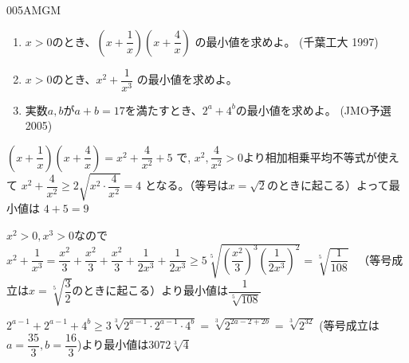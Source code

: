 \begin{thm}{005}{}{AMGM}
 \begin{enumerate}
  \item $x>0$のとき、$\left(x+\dfrac{1}{x}\right)\left(x+\dfrac{4}{x}\right)$ の最小値を求めよ。 (千葉工大 1997)
  \item $x>0$のとき、$x^2+\dfrac{1}{x^3}$ の最小値を求めよ。
  \item 実数$a,b$が$a+b=17$を満たすとき、$2^a+4^b$の最小値を求めよ。 (JMO予選 2005)
 \end{enumerate}
\end{thm}

$\left(x+\dfrac{1}{x}\right)\left(x+\dfrac{4}{x}\right)=x^2+\dfrac{4}{x^2}+5$ で, $x^2,\dfrac{4}{x^2}>0$より相加相乗平均不等式が使えて $x^2+\dfrac{4}{x^2}\geq 2\sqrt{x^2\cdot \dfrac{4}{x^2}}=4$ となる。（等号は$x=\sqrt{2}$のときに起こる）よって最小値は $4+5=9$

$x^2>0, x^3>0$なので$x^2+\dfrac{1}{x^3}=\dfrac{x^2}{3}+\dfrac{x^2}{3}+\dfrac{x^2}{3}+\dfrac{1}{2x^3}+\dfrac{1}{2x^3}\geq 5\sqrt[5]{\left(\dfrac{x^2}{3}\right)^3\left(\dfrac{1}{2x^3}\right)^2}=\sqrt[5]{\dfrac{1}{108}}$ 　（等号成立は$x=\sqrt[5]{\dfrac{3}{2}}$のときに起こる）より最小値は$\dfrac{1}{\sqrt[5]{108}}$

$2^{a-1}+2^{a-1}+4^b\geq 3\sqrt[3]{2^{a-1}\cdot 2^{a-1}\cdot 4^b}=\sqrt[3]{2^{2a-2+2b}}=\sqrt[3]{2^{32}}$ (等号成立は$a=\dfrac{35}{3}, b=\dfrac{16}{3}$)より最小値は$3072\sqrt[3]{4}$

